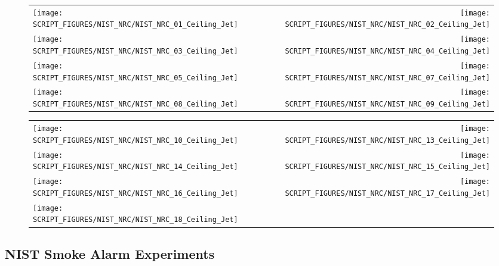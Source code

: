 \begin{figure}[p]
\begin{tabular*}{\textwidth}{l@{\extracolsep{\fill}}r}
\texttt{[image: SCRIPT\_FIGURES/NIST\_NRC/NIST\_NRC\_01\_Ceiling\_Jet]} &
\texttt{[image: SCRIPT\_FIGURES/NIST\_NRC/NIST\_NRC\_02\_Ceiling\_Jet]} \\
\texttt{[image: SCRIPT\_FIGURES/NIST\_NRC/NIST\_NRC\_03\_Ceiling\_Jet]} &
\texttt{[image: SCRIPT\_FIGURES/NIST\_NRC/NIST\_NRC\_04\_Ceiling\_Jet]} \\
\texttt{[image: SCRIPT\_FIGURES/NIST\_NRC/NIST\_NRC\_05\_Ceiling\_Jet]} &
\texttt{[image: SCRIPT\_FIGURES/NIST\_NRC/NIST\_NRC\_07\_Ceiling\_Jet]} \\
\texttt{[image: SCRIPT\_FIGURES/NIST\_NRC/NIST\_NRC\_08\_Ceiling\_Jet]} &
\texttt{[image: SCRIPT\_FIGURES/NIST\_NRC/NIST\_NRC\_09\_Ceiling\_Jet]}
\end{tabular*}
\end{figure}

\begin{figure}[p]
\begin{tabular*}{\textwidth}{l@{\extracolsep{\fill}}r}
\texttt{[image: SCRIPT\_FIGURES/NIST\_NRC/NIST\_NRC\_10\_Ceiling\_Jet]} &
\texttt{[image: SCRIPT\_FIGURES/NIST\_NRC/NIST\_NRC\_13\_Ceiling\_Jet]} \\
\texttt{[image: SCRIPT\_FIGURES/NIST\_NRC/NIST\_NRC\_14\_Ceiling\_Jet]} &
\texttt{[image: SCRIPT\_FIGURES/NIST\_NRC/NIST\_NRC\_15\_Ceiling\_Jet]} \\
\texttt{[image: SCRIPT\_FIGURES/NIST\_NRC/NIST\_NRC\_16\_Ceiling\_Jet]} &
\texttt{[image: SCRIPT\_FIGURES/NIST\_NRC/NIST\_NRC\_17\_Ceiling\_Jet]} \\
\texttt{[image: SCRIPT\_FIGURES/NIST\_NRC/NIST\_NRC\_18\_Ceiling\_Jet]}
\end{tabular*}
\end{figure}

\clearpage

\subsection{NIST Smoke Alarm Experiments}

